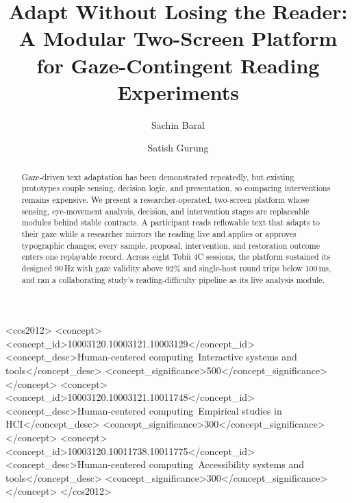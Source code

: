 \documentclass[sigconf,screen]{acmart}
\begin{document}
\title[Adapt Without Losing the Reader]{Adapt Without Losing the Reader: A Modular Two-Screen Platform for Gaze-Contingent Reading Experiments}

\author{Sachin Baral}

\author{Satish Gurung}

\renewcommand{\shortauthors}{Baral and Gurung}

\begin{abstract}
Gaze-driven text adaptation has been demonstrated repeatedly, but existing prototypes couple sensing, decision logic, and presentation, so comparing interventions remains expensive.
We present a researcher-operated, two-screen platform whose sensing, eye-movement analysis, decision, and intervention stages are replaceable modules behind stable contracts.
A participant reads reflowable text that adapts to their gaze while a researcher mirrors the reading live and applies or approves typographic changes; every sample, proposal, intervention, and restoration outcome enters one replayable record.
Across eight Tobii 4C sessions, the platform sustained its designed 90\,Hz with gaze validity above 92\% and single-host round trips below 100\,ms, and ran a collaborating study's reading-difficulty pipeline as its live analysis module.
\end{abstract}

\begin{CCSXML}
<ccs2012>
<concept>
<concept_id>10003120.10003121.10003129</concept_id>
<concept_desc>Human-centered computing~Interactive systems and tools</concept_desc>
<concept_significance>500</concept_significance>
</concept>
<concept>
<concept_id>10003120.10003121.10011748</concept_id>
<concept_desc>Human-centered computing~Empirical studies in HCI</concept_desc>
<concept_significance>300</concept_significance>
</concept>
<concept>
<concept_id>10003120.10011738.10011775</concept_id>
<concept_desc>Human-centered computing~Accessibility systems and tools</concept_desc>
<concept_significance>300</concept_significance>
</concept>
</ccs2012>
\end{CCSXML}
\end{document}
